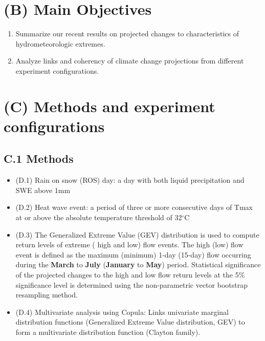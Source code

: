 \documentclass[a0,landscape]{a0poster}
\begin{document}
\begin{multicols*}{4}
\section*{(B) Main Objectives}
\begin{tcolorbox}[colback=white,colframe=green!40!black]
  \color{DarkSlateGray}
  \begin{enumerate}
    \item Summarize our recent results on projected changes to characteristics of hydrometeorologic extremes.
    \item Analyze links and coherency of climate change projections from different experiment configurations.
  \end{enumerate}
\end{tcolorbox}


\section*{(C) Methods and experiment configurations}
\subsection*{C.1 Methods}
%
\begin{itemize}
  \item (D.1) Rain on snow (ROS) day:  a day with both liquid precipitation and SWE above 1mm
  \item (D.2) Heat wave event: a period of three or more consecutive days of Tmax at or above the absolute temperature threshold of 32$^\circ$C
  \item (D.3) The Generalized Extreme Value (GEV) distribution is used to compute return
        levels of extreme ({\color{red} high} and {\color{blue}low}) flow events. The {\color{red} high} ({\color{blue}low}) flow event is
        defined as the maximum (minimum) 1-day (15-day) flow occurring during the \textbf{March}
        to \textbf{July} (\textbf{January} to \textbf{May}) period. Statistical significance of the projected
        changes to the {\color{red} high} and {\color{blue}low} flow return levels at the 5\%
        significance level is determined using the non-parametric vector bootstrap
        resampling method.
  \item (D.4) Multivariate analysis using Copula: Links univariate marginal distribution
         functions (Generalized Extreme Value distribution, GEV) to form a multivariate
        distribution function (Clayton family).
\end{itemize}


\end{multicols*}
\end{document}

